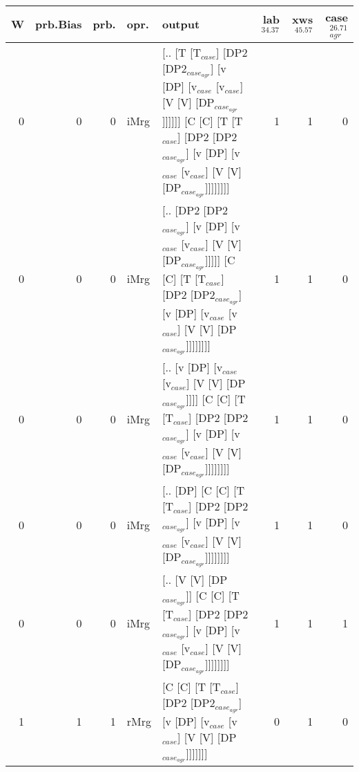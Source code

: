 \begin{tabularx}{\linewidth}{rrrlXrrr}
\hline
   W &   prb.Bias &   prb. & opr.   & output                                                                                                                                                                             &   lab$^{34.37}$ &   xws$^{45.57}$ &   case$_{agr}^{26.71}$ \\
\hline
   0 &       0 &   0 & iMrg & [.. [T [T$_{case}$] [DP2 [DP2$_{case_{agr}}$] [v [DP] [v$_{case}$ [v$_{case}$] [V [V] [DP$_{case_{agr}}$]]]]]] [C [C] [T [T$_{case}$] [DP2 [DP2$_{case_{agr}}$] [v [DP] [v$_{case}$ [v$_{case}$] [V [V] [DP$_{case_{agr}}$]]]]]]]] &             1 &             1 &                  0 \\
   0 &       0 &   0 & iMrg & [.. [DP2 [DP2$_{case_{agr}}$] [v [DP] [v$_{case}$ [v$_{case}$] [V [V] [DP$_{case_{agr}}$]]]]] [C [C] [T [T$_{case}$] [DP2 [DP2$_{case_{agr}}$] [v [DP] [v$_{case}$ [v$_{case}$] [V [V] [DP$_{case_{agr}}$]]]]]]]]              &             1 &             1 &                  0 \\
   0 &       0 &   0 & iMrg & [.. [v [DP] [v$_{case}$ [v$_{case}$] [V [V] [DP$_{case_{agr}}$]]]] [C [C] [T [T$_{case}$] [DP2 [DP2$_{case_{agr}}$] [v [DP] [v$_{case}$ [v$_{case}$] [V [V] [DP$_{case_{agr}}$]]]]]]]]                                   &             1 &             1 &                  0 \\
   0 &       0 &   0 & iMrg & [.. [DP] [C [C] [T [T$_{case}$] [DP2 [DP2$_{case_{agr}}$] [v [DP] [v$_{case}$ [v$_{case}$] [V [V] [DP$_{case_{agr}}$]]]]]]]]                                                                               &             1 &             1 &                  0 \\
   0 &       0 &   0 & iMrg & [.. [V [V] [DP$_{case_{agr}}$]] [C [C] [T [T$_{case}$] [DP2 [DP2$_{case_{agr}}$] [v [DP] [v$_{case}$ [v$_{case}$] [V [V] [DP$_{case_{agr}}$]]]]]]]]                                                              &             1 &             1 &                  1 \\
   1 &       1 &   1 & rMrg & [C [C] [T [T$_{case}$] [DP2 [DP2$_{case_{agr}}$] [v [DP] [v$_{case}$ [v$_{case}$] [V [V] [DP$_{case_{agr}}$]]]]]]]                                                                                         &             0 &             1 &                  0 \\
\hline
\end{tabularx}\endgroup\\

